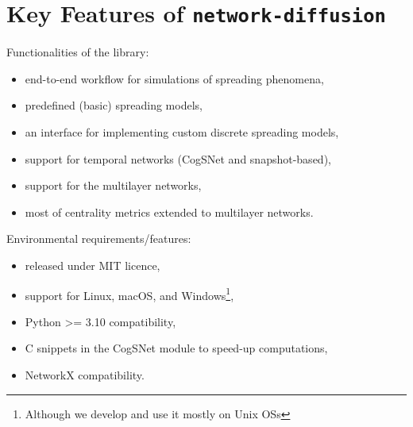 \documentclass{beamer}
\begin{document}
\section{Key Features of \lstinline[style=py]{network-diffusion}}

\begin{frame}{\secname}
    Functionalities of the library:
    \vspace{1em}
    \begin{itemize}[<+->]
        \item end-to-end workflow for simulations of spreading phenomena,
        \item predefined (basic) spreading models,
        \item an interface for implementing custom discrete spreading models,
        \item support for temporal networks (CogSNet and snapshot-based),
        \item support for the multilayer networks,
        \item most of centrality metrics extended to multilayer networks.
    \end{itemize}
\end{frame}

\begin{frame}{\secname}
    Environmental requirements/features:
    \vspace{1em}
    \begin{itemize}
        \item released under MIT licence,
        \item support for Linux, macOS, and Windows\footnote{Although we develop and use it mostly on Unix OSs},
        \item Python >= 3.10 compatibility,
        \item C snippets in the CogSNet module to speed-up computations,
        \item NetworkX compatibility.
    \end{itemize}
\end{frame}

\end{document}
